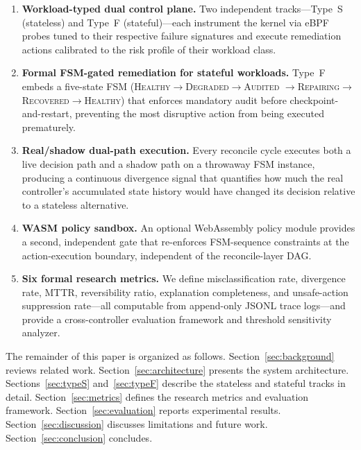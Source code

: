 \documentclass[runningheads]{llncs}
\begin{document}
\begin{enumerate}
  \item \textbf{Workload-typed dual control plane.} Two independent
    tracks---Type~S (stateless) and Type~F (stateful)---each instrument
    the kernel via eBPF probes tuned to their respective failure
    signatures and execute remediation actions calibrated to the risk
    profile of their workload class.

  \item \textbf{Formal FSM-gated remediation for stateful workloads.}
    Type~F embeds a five-state FSM
    (\textsc{Healthy}$\to$\textsc{Degraded}$\to$\textsc{Audited}
    $\to$\textsc{Repairing}$\to$\textsc{Recovered}$\to$\textsc{Healthy})
    that enforces mandatory audit before checkpoint-and-restart, preventing
    the most disruptive action from being executed prematurely.

  \item \textbf{Real/shadow dual-path execution.} Every reconcile cycle
    executes both a live decision path and a shadow path on a throwaway
    FSM instance, producing a continuous divergence signal that quantifies
    how much the real controller's accumulated state history would have
    changed its decision relative to a stateless alternative.

  \item \textbf{WASM policy sandbox.} An optional WebAssembly policy
    module provides a second, independent gate that re-enforces
    FSM-sequence constraints at the action-execution boundary,
    independent of the reconcile-layer DAG.

  \item \textbf{Six formal research metrics.} We define misclassification
    rate, divergence rate, MTTR, reversibility ratio, explanation
    completeness, and unsafe-action suppression rate---all computable
    from append-only JSONL trace logs---and provide a cross-controller
    evaluation framework and threshold sensitivity analyzer.
\end{enumerate}

The remainder of this paper is organized as follows.
Section~\ref{sec:background} reviews related work.
Section~\ref{sec:architecture} presents the system architecture.
Sections~\ref{sec:typeS} and~\ref{sec:typeF} describe the stateless
and stateful tracks in detail.  Section~\ref{sec:metrics} defines the
research metrics and evaluation framework.
Section~\ref{sec:evaluation} reports experimental results.
Section~\ref{sec:discussion} discusses limitations and future work.
Section~\ref{sec:conclusion} concludes.
\end{document}
